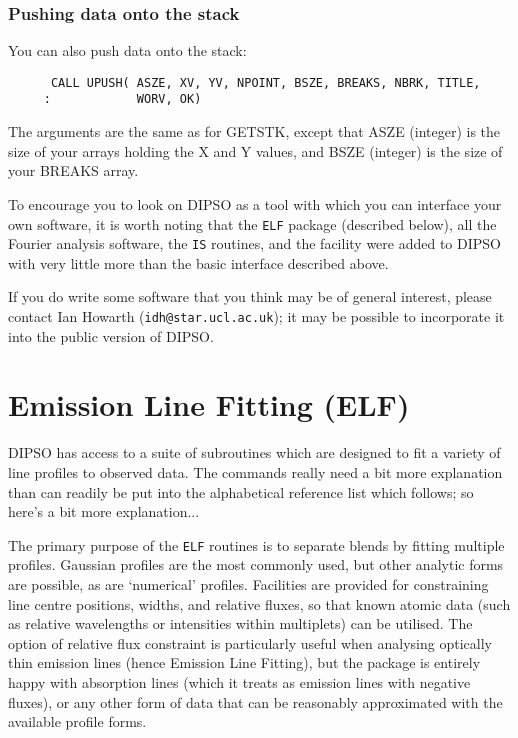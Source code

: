 \subsubsection {Pushing data onto the stack}

You can also push data onto the stack:

\begin{verbatim}
      CALL UPUSH( ASZE, XV, YV, NPOINT, BSZE, BREAKS, NBRK, TITLE, 
     :            WORV, OK)
\end{verbatim}

The arguments are the same as for GETSTK, except that ASZE (integer)
is the size of your arrays holding the X and Y values, and BSZE
(integer) is the size of your BREAKS array.

To encourage you to look on DIPSO as a tool with which you can interface
your own software, it is worth noting that the {\tt{ELF}}  package
(described below), all the Fourier analysis software, the {\tt{IS}} 
routines, and the   facility were added to DIPSO with very
little more than the basic interface described above.

If you do write some software that you think may be of general interest, please
contact Ian Howarth ({\tt{idh@star.ucl.ac.uk}});  it may be
possible to incorporate it into the public version of DIPSO.

\section {Emission Line Fitting (ELF)}

DIPSO has access to a suite of subroutines which are designed to fit a
variety of line profiles to observed data. The commands really need a
bit more explanation than can readily be put into the alphabetical
reference list which follows; so here's a bit more explanation...

The primary purpose of the {\tt{ELF}}  routines is to separate blends by
fitting multiple profiles. Gaussian profiles are the most commonly
used, but other analytic forms are possible, as are `numerical'
profiles. Facilities are provided for constraining line centre
positions, widths, and relative fluxes, so that known atomic data
(such as relative wavelengths or intensities within multiplets) can be
utilised. The option of relative flux constraint is particularly
useful when analysing optically thin emission lines (hence Emission
Line Fitting), but the package is entirely happy with absorption lines
(which it treats as emission lines with negative fluxes), or any other
form of data that can be reasonably approximated with the available
profile forms.

